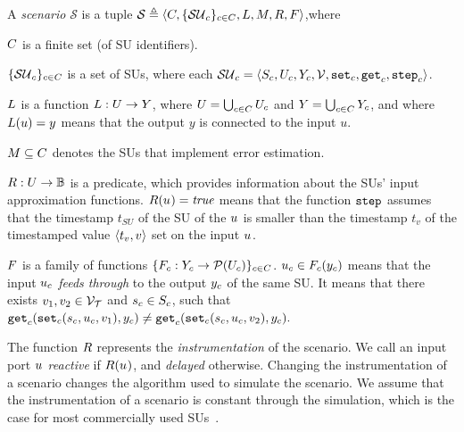 \begin{definition}[Scenario]\label{def:cosim_scenario}
  A \emph{scenario} $\mathcal{S}$ is a tuple $\mathcal{S} \triangleq  \left\langle C, \{\mathcal{SU}_c\}_{c \in C}, L, M, R, F \right\rangle $,where 
  \begin{compactitem}
    \item $C$ is a finite set (of SU identifiers). 
    \item $\{\mathcal{SU}_c\}_{c \in C}$ is a set of SUs, where each $\mathcal{SU}_c =  \left\langle S_{c}, U_{c}, Y_{c}, \mathcal{V}, \mathtt{set}_{c}, \mathtt{get}_{c}, \mathtt{step}_{c} \right\rangle $.
    \item
    $L$ is a function $L : U \to Y$, where $U = \bigcup_{c \in C} U_{c}$ and $Y = \bigcup_{c \in C} Y_{c}$, and where 
    $L(u)=y$ means that the output $y$ is connected to the input $u$.   
    \item $M \subseteq C$ denotes the SUs that implement error estimation. 
    \item
    $R : U \to \mathbb{B}$ is a predicate, which provides information about the SUs' input approximation functions.
    $R(u_{}) = \mathit{true}$ means that the function $\mathtt{step}_{}$ assumes that the timestamp $t_{SU}$ of the SU of the $u_{}$ is smaller than the timestamp $t_v$ of the timestamped value $ \left\langle t_v,v \right\rangle $ set on the input $u_{}$.
    \item $F$ is a family of functions $\{F_{c} : Y_{c} \to \mathcal{P}(U_{c})\}_{c \in C}$.
    $u_{c} \in F_{c}(y_{c})$ means that the input $u_{c}$ \emph{feeds through} to the output $y_{c}$ of the same SU.
    It means that there exists $v_1, v_2 \in \mathcal{V_{T}}$ and $s_{c} \in S_{c}$, such that
    $\mathtt{get}_{c} (\mathtt{set}_{c}(s_{c}, u_{c}, v_1), y_{c}) \neq \mathtt{get}_{c} (\mathtt{set}_{c}(s_{c}, u_{c}, v_2), y_{c}).$
  \end{compactitem}
\end{definition}

The function $R$ represents the \emph{instrumentation} of the scenario.
We call an input port $u_{}$ \emph{reactive} if $R(u_{})$, and \emph{delayed} otherwise. 
Changing the instrumentation of a scenario changes the algorithm used to simulate the scenario.
We assume that the instrumentation of a scenario is constant through the simulation, which is the case for most commercially used SUs~\cite{Gomes2018a}.

